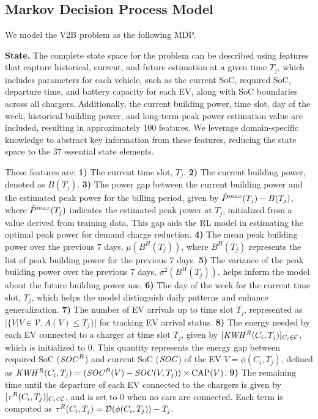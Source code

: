 \subsection{Markov Decision Process Model}
\label{ssec:MDP}

We model the V2B problem as the following MDP. 

{\bf State.}
The complete state space for the problem can be described using features that capture historical, current, and future estimation at a given time $T_j$, which includes parameters for each vehicle, such as the current SoC, required SoC, departure time, and battery capacity for each EV, along with SoC boundaries across all chargers. Additionally, the current building power, time slot, day of the week, historical building power, and long-term peak power estimation value are included, resulting in approximately $100$ features. 
We leverage domain-specific knowledge to abstract key information from these features, reducing the state space to the $37$ essential state elements.

These features are:
\textbf{1)} The current time slot, $T_j$. \textbf{2)} The current building power, denoted as ${B}(T_j)$. \textbf{3)} The power gap between the current building power and the estimated peak power for the billing period, given by $ \hat{P}^{max}(T_j) - B(T_j)$, where $\hat{P}^{max}(T_j)$ indicates the estimated peak power at $T_j$, initialized from a value derived from training data. This gap aids the RL model in estimating the optimal peak power for demand charge reduction. \textbf{4)} The mean peak building power over the previous 7 days, $\mu(B^H(T_j))$, where $B^H(T_j)$ represents the list of peak building power for the previous 7 days. \textbf{5)} {The variance of the peak building power over the previous 7 days, $\sigma^2(B^H(T_j))$, helps inform the model about the future building power use}. \textbf{6)} The day of the week for the current time slot, $T_j$, which helps the model distinguish daily patterns and enhance generalization. \textbf{7)} The number of EV arrivals up to time slot $T_j$, represented as $|\{V | V \in \mathcal{V}, A(V) \leq T_j \}|$ for tracking EV arrival status. \textbf{8)} The energy needed by each EV connected to a charger at time slot $T_j$, given by $[{\it KWH^{R}}(C_i, T_j)]_{C_i \in \mathcal{C}}$, which is initialized to $0$. This quantity represents the energy gap between required SoC (${{\it SOC}^{R}}$) and current SoC ($\it{SOC}$) of the EV $V = \phi(C_i, T_j)$, defined as ${\it KWH^{R}}(C_i, T_j) = ({{\it SOC}^{R}}(V) - {{\it SOC}}(V, T_j)) \times \text{CAP}(V)$.
\textbf{9)} The remaining time until the departure of each EV connected to the chargers is given by $[\tau^R(C_i, T_j)]_{C_i \in \mathcal{C}}$, and is set to 0 when no cars are connected. Each term is computed as $\tau^R(C_i, T_j) = \mathcal{D}(\phi(C_i, T_j)) - T_j$. 

